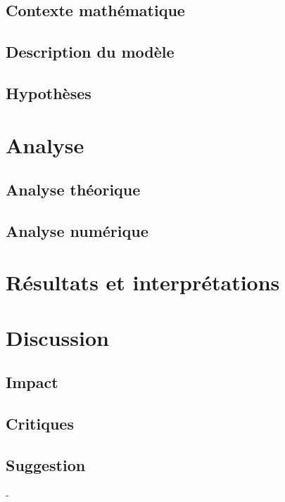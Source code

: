 \documentclass[fleqn,10pt]{SelfArx}
\begin{document}
\subsection*{Contexte mathématique}
\subsection*{Description du modèle} %
\subsection*{Hypothèses} %

\section*{Analyse}
\subsection*{Analyse théorique}
\subsection*{Analyse numérique}

\section*{Résultats et interprétations }

\section*{Discussion}
\subsection*{Impact}
\subsection*{Critiques}
\subsection*{Suggestion}






-
\end{document}
